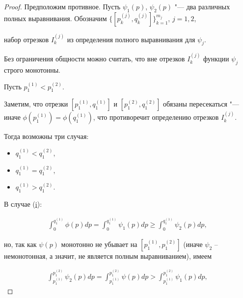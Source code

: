 \begin{proof} Предположим противное. Пусть $\psi_1(p)$, $\psi_2(p)$ "--- два различных полных выравнивания. Обозначим $\{[p_k^{(j)},q_k^{(j)}]\}_{k=1}^{m_j}$, $j=1,2$, 

набор отрезков $I_k^{(j)}$ из определения полного выравнивания для $\psi_j$. 

Без ограничения общности можно считать, что вне отрезков $I_k^{(j)}$ функции $\psi_j$ строго монотонны. 

Пусть $p_1^{(1)}<p_1^{(2)}$. 

Заметим, что отрезки $[p_1^{(1)},q_1^{(1)}]$ и $[p_1^{(2)},q_1^{(2)}]$ обязаны пересекаться "--- иначе $\phi(p_1^{(1)})=\phi(q_1^{(1)})$, что противоречит определению отрезков $I_k^{(j)}$. 

Тогда возможны три случая:



\begin{itemize}

\item[(i)] \hypertarget{8i}{} $q_1^{(1)}<q_1^{(2)}$,

\item[(ii)] \hypertarget{8ii}{}  $q_1^{(1)}=q_1^{(2)}$,

\item[(iii)] \hypertarget{8iii}{} $q_1^{(1)}>q_1^{(2)}$.



\end{itemize}



В случае (\hyperlink{8i}{i}):

\begin{gather}

\int _0^{q_1^{(1)}}\phi(p)dp=\int _0^{q_1^{(1)}}\psi_1(p)dp\ge\int _0^{q_1^{(1)}}\psi_2(p)dp,\label{eq-SupportiveForProof-E*-unique-1}

\end{gather}

но, так как $\psi(p)$ монотонно не убывает на $[p_1^{(1)},p_1^{(2)}]$ (иначе $\psi_2$ -- немонотонная, а значит, не является полным выравниванием), имеем

\begin{gather}

\int _{p_1^{(1)}}^{p_1^{(2)}}\psi_2(p)dp=\int _{p_1^{(1)}}^{p_1^{(2)}}\psi(p)dp>\int _{p_1^{(1)}}^{p_1^{(2)}}\psi_1(p)dp,\label{eq-SupportiveForProof-E*-unique-2}

\end{gather}


\end{proof}
